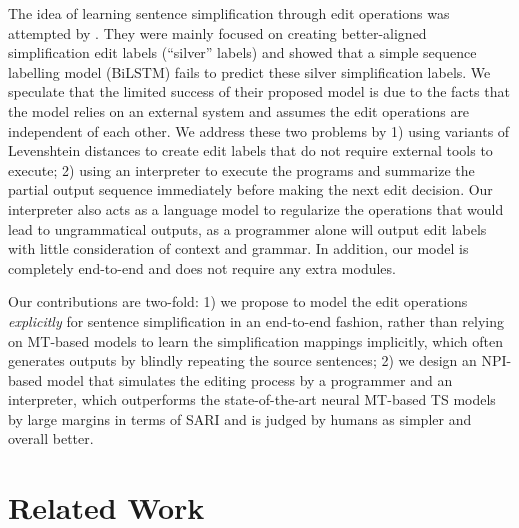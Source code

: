 \documentclass[11pt,a4paper]{article}
\begin{document}
The idea of learning sentence simplification through edit operations was attempted by \citet{alva2017learning}. They were mainly focused on creating better-aligned simplification edit labels (``silver'' labels) and showed that a simple sequence labelling model (BiLSTM)  fails to predict these silver simplification labels. We speculate that the limited success of their proposed model is due to the facts that the model relies on an external system and assumes the edit operations are independent of each other. We address these two problems by 1) using variants of Levenshtein distances to create edit labels that do not require external tools to execute;  2) using an interpreter to execute the programs and summarize the partial output sequence immediately before making the next edit decision.  Our interpreter also acts as a language model to regularize the operations that would lead to ungrammatical outputs, as a  programmer alone will output edit labels with little consideration of context and grammar. In addition, our model is completely end-to-end and does not require any extra modules.



Our contributions are two-fold:
1) we propose to model the edit operations \textit{explicitly} for sentence simplification in an end-to-end fashion, rather than relying on MT-based models to learn the simplification mappings implicitly, which often generates outputs by blindly repeating the source sentences; 2) we design an NPI-based model that simulates the editing process by a programmer and an interpreter, which outperforms the state-of-the-art neural MT-based TS models by large margins in terms of SARI and is judged by humans as simpler and overall better.




\section{Related Work}
\end{document}
